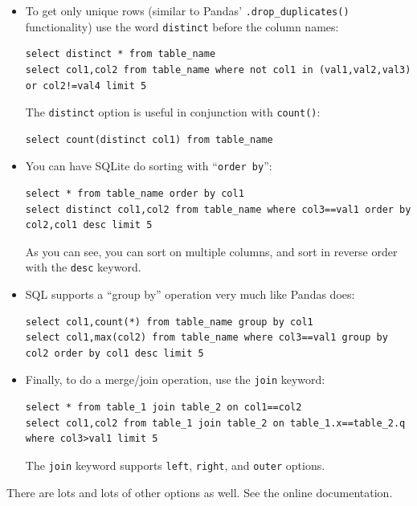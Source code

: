 \documentclass[12pt]{article}
\begin{document}
\begin{itemize}
\item To get only unique rows (similar to Pandas' \texttt{.drop\_duplicates()}
functionality) use the word \texttt{distinct} before the column names:

\scriptsize
\begin{Verbatim}[fontsize=\small,samepage=true,frame=none]
select distinct * from table_name
select col1,col2 from table_name where not col1 in (val1,val2,val3) or col2!=val4 limit 5
\end{Verbatim}
\normalsize

The \texttt{distinct} option is useful in conjunction with \texttt{count()}:
\scriptsize
\begin{Verbatim}[fontsize=\small,samepage=true,frame=none]
select count(distinct col1) from table_name
\end{Verbatim}
\normalsize

\item You can have SQLite do sorting with ``\texttt{order by}'':
\scriptsize
\begin{Verbatim}[fontsize=\small,samepage=true,frame=none]
select * from table_name order by col1
select distinct col1,col2 from table_name where col3==val1 order by col2,col1 desc limit 5
\end{Verbatim}
\normalsize

As you can see, you can sort on multiple columns, and sort in reverse order
with the \texttt{desc} keyword.

\item SQL supports a ``group by'' operation very much like Pandas does:

\scriptsize
\begin{Verbatim}[fontsize=\small,samepage=true,frame=none]
select col1,count(*) from table_name group by col1
select col1,max(col2) from table_name where col3==val1 group by col2 order by col1 desc limit 5
\end{Verbatim}
\normalsize

\item Finally, to do a merge/join operation, use the \texttt{join} keyword:

\scriptsize
\begin{Verbatim}[fontsize=\small,samepage=true,frame=none]
select * from table_1 join table_2 on col1==col2
select col1,col2 from table_1 join table_2 on table_1.x==table_2.q where col3>val1 limit 5
\end{Verbatim}
\normalsize

The \texttt{join} keyword supports \texttt{left}, \texttt{right}, and
\texttt{outer} options.

\end{itemize}

There are lots and lots of other options as well. See the online
documentation.
\end{document}
